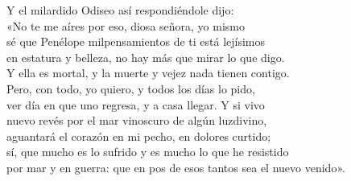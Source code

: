 %
%
%
%


\begin{versocita}
Y el milardido Odiseo así respondiéndole dijo:\\
«No te me aíres por eso, diosa señora, yo mismo\\
sé que Penélope milpensamientos de ti está lejísimos\\
en estatura y belleza, no hay más que mirar lo que digo.\\
Y ella es mortal, y la muerte y vejez nada tienen contigo.\\
Pero, con todo, yo quiero, y todos los días lo pido,\\
ver día en que uno regresa, y a casa llegar. Y si vivo\\
nuevo revés por el mar vinoscuro de algún luzdivino,\\
aguantará el corazón en mi pecho, en dolores curtido;\\
sí, que mucho es lo sufrido y es mucho lo que he resistido\\
por mar y en guerra: que en pos de esos tantos sea el nuevo venido».
\end{versocita}

